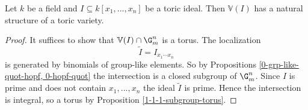 \begin{proposition}
  \label{5-3-tor-loc}
  \uses{}

  Let $k$ be a field and $I\subseteq k[x_1,\dots,x_n]$ be a toric ideal.
  Then $\mathbb{V}(I)$ has a natural structure of a toric variety.
\end{proposition}
\begin{proof}

  It suffices to show that $\mathbb{V}(I)\cap \G_m^n$ is a torus. The localization
  \[
    \tilde{I} = I_{x_1\cdots x_n}
  \]
  is generated by binomials of group-like elements. So by Propositions \ref{0-grp-like-quot-hopf, 0-hopf-quot}
  the intersection is a closed subgroup of $\G_m^n$. Since $I$ is prime and does not contain $x_1,...,x_n$
  the ideal $\tilde{I}$ is prime. Hence the intersection is integral,
  so a torus by Proposition \ref{1-1-1-subgroup-torus}.
\end{proof}
